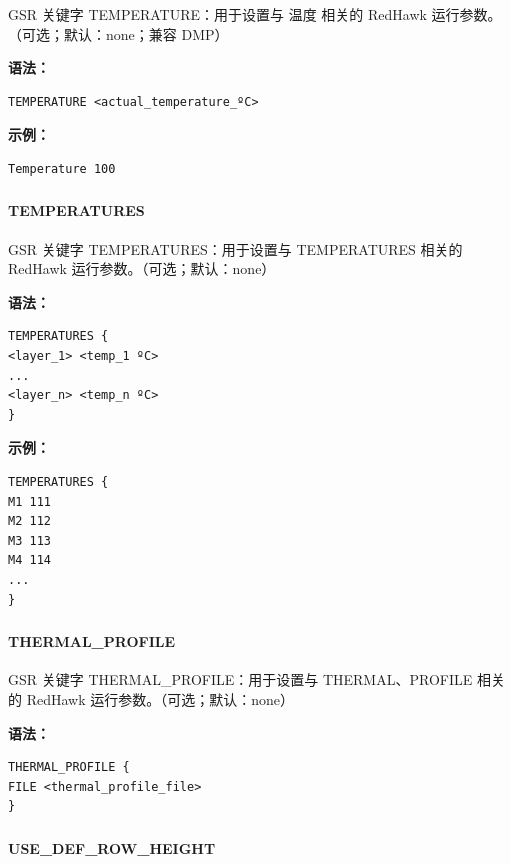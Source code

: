 GSR 关键字 TEMPERATURE：用于设置与 温度 相关的 RedHawk 运行参数。（可选；默认：none；兼容 DMP）

\textbf{语法：}
\begin{lstlisting}
TEMPERATURE <actual_temperature_ºC>
\end{lstlisting}

\textbf{示例：}
\begin{lstlisting}
Temperature 100
\end{lstlisting}

\subsubsection{}
\paragraph*{TEMPERATURES}

GSR 关键字 TEMPERATURES：用于设置与 TEMPERATURES 相关的 RedHawk 运行参数。（可选；默认：none）

\textbf{语法：}
\begin{lstlisting}
TEMPERATURES {
<layer_1> <temp_1 ºC>
...
<layer_n> <temp_n ºC>
}
\end{lstlisting}

\textbf{示例：}
\begin{lstlisting}
TEMPERATURES {
M1 111
M2 112
M3 113
M4 114
...
}
\end{lstlisting}

\subsubsection{}
\paragraph*{THERMAL_PROFILE}

GSR 关键字 THERMAL_PROFILE：用于设置与 THERMAL、PROFILE 相关的 RedHawk 运行参数。（可选；默认：none）

\textbf{语法：}
\begin{lstlisting}
THERMAL_PROFILE {
FILE <thermal_profile_file>
}
\end{lstlisting}

\subsubsection{}
\paragraph*{USE_DEF_ROW_HEIGHT}

